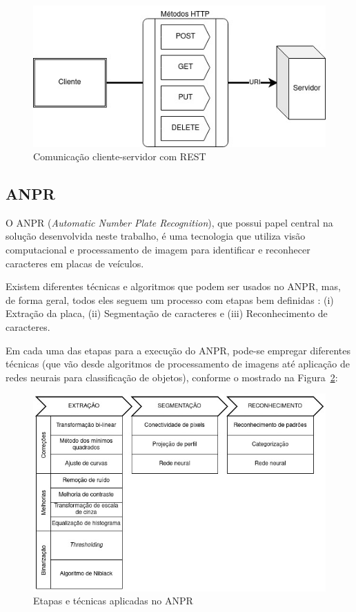\documentclass[12pt]{article}
\begin{document}
\begin{figure}[ht]
	\centering
	\includegraphics[width=.8\textwidth]{rest.jpg}
	\caption{Comunicação cliente-servidor com REST}
	\label{fig:rest}
\end{figure} 

\subsection{ANPR}

O ANPR (\textit{Automatic Number Plate Recognition}), que possui papel central na solução desenvolvida neste trabalho, é uma tecnologia que utiliza visão computacional e processamento de imagem para identificar e reconhecer caracteres em placas de veículos.

Existem diferentes técnicas e algoritmos que podem ser usados no ANPR, mas, de forma geral, todos eles seguem um processo com etapas bem definidas \cite{mufti2021}: (i) Extração da placa, (ii) Segmentação de caracteres e (iii) Reconhecimento de caracteres.

Em cada uma das etapas para a execução do ANPR, \cite{shashirangana2020} pode-se empregar diferentes técnicas (que vão desde algoritmos de processamento de imagens até aplicação de redes neurais para classificação de objetos), conforme o mostrado na Figura~\ref{fig:anpr-steps}:

\begin{figure}[ht]
	\centering
	\includegraphics[width=1\textwidth]{anpr-steps.jpg}
	\caption{Etapas e técnicas aplicadas no ANPR}
	\label{fig:anpr-steps}
\end{figure} 
\end{document}
